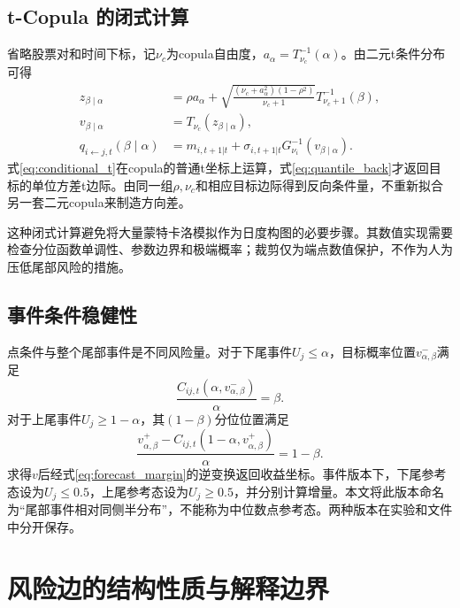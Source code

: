 \subsection{t-Copula 的闭式计算}
省略股票对和时间下标，记$\nu_c$为copula自由度，$a_{\alpha}=T_{\nu_c}^{-1}(\alpha)$。由二元t条件分布可得
\begin{align}
z_{\beta\mid\alpha}
&=\rho a_{\alpha}+\sqrt{\frac{(\nu_c+a_{\alpha}^{2})(1-\rho^{2})}{\nu_c+1}}
T_{\nu_c+1}^{-1}(\beta),\label{eq:conditional_t}\\
v_{\beta\mid\alpha}&=T_{\nu_c}(z_{\beta\mid\alpha}),\label{eq:prob_position}\\
q_{i\leftarrow j,t}(\beta\mid\alpha)
&=m_{i,t+1|t}+\sigma_{i,t+1|t}G_{\nu_i}^{-1}(v_{\beta\mid\alpha}).\label{eq:quantile_back}
\end{align}
式\eqref{eq:conditional_t}在copula的普通t坐标上运算，式\eqref{eq:quantile_back}才返回目标的单位方差t边际。由同一组$\rho,\nu_c$和相应目标边际得到反向条件量，不重新拟合另一套二元copula来制造方向差。

这种闭式计算避免将大量蒙特卡洛模拟作为日度构图的必要步骤。其数值实现需要检查分位函数单调性、参数边界和极端概率；裁剪仅为端点数值保护，不作为人为压低尾部风险的措施。

\subsection{事件条件稳健性}
点条件与整个尾部事件是不同风险量\cite{mainik2012}。对于下尾事件$U_j\leq\alpha$，目标概率位置$v^-_{\alpha,\beta}$满足
\begin{equation}\label{eq:event_lower}
\frac{C_{ij,t}(\alpha,v^-_{\alpha,\beta})}{\alpha}=\beta.
\end{equation}
对于上尾事件$U_j\geq1-\alpha$，其$(1-\beta)$分位位置满足
\begin{equation}\label{eq:event_upper}
\frac{v^+_{\alpha,\beta}-C_{ij,t}(1-\alpha,v^+_{\alpha,\beta})}{\alpha}=1-\beta.
\end{equation}
求得$v$后经式\eqref{eq:forecast_margin}的逆变换返回收益坐标。事件版本下，下尾参考态设为$U_j\leq0.5$，上尾参考态设为$U_j\geq0.5$，并分别计算增量。本文将此版本命名为“尾部事件相对同侧半分布”，不能称为中位数点参考态。两种版本在实验和文件中分开保存。

\section{风险边的结构性质与解释边界}
